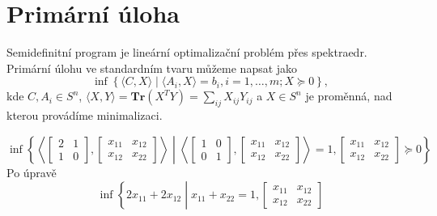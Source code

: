 \section{Primární úloha}

Semidefinitní program je lineární optimalizační problém přes spektraedr. Primární úlohu ve standardním tvaru můžeme napsat jako
\begin{equation}\tag{SDP-P}
    \inf \left\{ \langle C, X \rangle \mid \langle A_i, X \rangle = b_i, i=1, \dots, m; X \succeq 0 \right\},
    \label{eq:SDP-P}
\end{equation}
kde $C, A_i \in S^n$, $\langle X, Y \rangle = \textbf{Tr}(X^T Y) = \sum_{ij} X_{ij}Y_{ij}$ a $X \in S^n$ je proměnná, nad kterou provádíme minimalizaci.

\begin{pr}
    \begin{equation}\tag{P3}
        \inf \left\{
            \left\langle
            \begin{bmatrix}
                2 & 1 \\
                1 & 0
            \end{bmatrix},
            \begin{bmatrix}
                x_{11} & x_{12} \\
                x_{12} & x_{22}
            \end{bmatrix}
            \right\rangle \middle|
            \left\langle
            \begin{bmatrix}
                1 & 0 \\
                0 & 1
            \end{bmatrix},
            \begin{bmatrix}
                x_{11} & x_{12} \\
                x_{12} & x_{22}
            \end{bmatrix}
            \right\rangle = 1,
            \begin{bmatrix}
                x_{11} & x_{12} \\
                x_{12} & x_{22}
            \end{bmatrix} \succeq 0
        \right\}
        \label{eq:P3}
    \end{equation}
    Po úpravě
    $$
        \inf \left\{
            2 x_{11} + 2 x_{12} \middle| x_{11} + x_{22} = 1, 
            \begin{bmatrix}
                x_{11} & x_{12} \\
                x_{12} & x_{22}

\end{bmatrix}$$
\end{pr}
